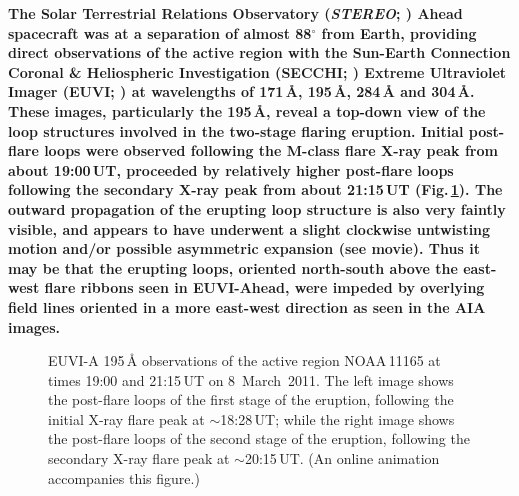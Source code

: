 \documentclass[namedreferences]{solarphysics}
\begin{document}
\begin{article}
{\bf The Solar Terrestrial Relations Observatory (\emph{STEREO}; ) Ahead spacecraft was at a separation of almost 88$^{\circ}$ from Earth, providing direct observations of the active region with the Sun-Earth Connection Coronal \& Heliospheric Investigation (SECCHI; ) Extreme Ultraviolet Imager (EUVI; ) at wavelengths of 171\,{\AA}, 195\,{\AA}, 284\,{\AA} and 304\,{\AA}. These images, particularly the 195\,{\AA}, reveal a top-down view of the loop structures involved in the two-stage flaring eruption. Initial post-flare loops were observed following the M-class flare X-ray peak from about 19:00\,UT, proceeded by relatively higher post-flare loops following the secondary X-ray peak from about 21:15\,UT (Fig.\,\ref{euvi}). The outward propagation of the erupting loop structure is also very faintly visible, and appears to have underwent a slight clockwise untwisting motion and/or possible asymmetric expansion (see movie). Thus it may be that the erupting loops, oriented north-south above the east-west flare ribbons seen in EUVI-Ahead, were impeded by overlying field lines oriented in a more east-west direction as seen in the AIA images.}

\begin{figure}[!t]
\caption{EUVI-A 195\,{\AA} observations of the active region NOAA\,11165 at times 19:00 and 21:15\,UT on 8~March~2011. The left image shows the post-flare loops of the first stage of the eruption, following the initial X-ray flare peak at $\sim$18:28\,UT; while the right image shows the post-flare loops of the second stage of the eruption, following the secondary X-ray flare peak at $\sim$20:15\,UT. (An online animation accompanies this figure.)}
\label{euvi}
\end{figure}


\end{article}
\end{document}
